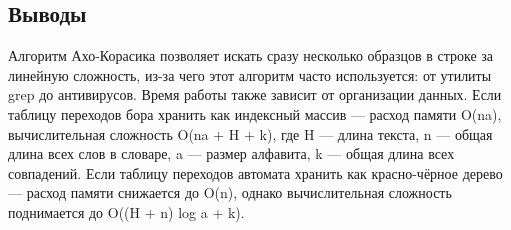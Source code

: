\documentclass[12pt]{article}
\begin{document}
\subsection*{Выводы}
Алгоритм Ахо-Корасика позволяет искать сразу несколько образцов в строке за линейную сложность, из-за чего этот алгоритм часто используется: от утилиты grep до антивирусов.
Время работы также зависит от организации данных. Если таблицу переходов бора хранить как индексный массив — расход памяти O(na), вычислительная сложность O(na + H + k), где H — длина текста, n — общая длина всех слов в словаре, a — размер алфавита, k — общая длина всех совпадений. Если таблицу переходов автомата хранить как красно-чёрное дерево — расход памяти снижается до O(n), однако вычислительная сложность поднимается до O((H + n) log a + k).
\end{document}
